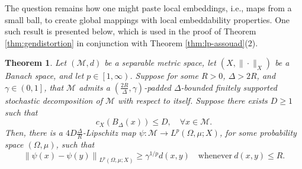 \documentclass[11pt,reqno]{amsart}
\newtheorem{theorem}{Theorem}
\newcommand{\1}{\mathbf 1}
\begin{document}
The question remains how one might paste local embeddings, i.e., maps from a small ball, to create global mappings with local embeddability properties. One such result is presented below, which is used in the proof of Theorem \ref{thm:gendistortion} in conjunction with Theorem \ref{thm:lp-assouad}(2).
\begin{theorem}
    Let $\left(\mathcal{M},d\right)$ be a separable metric space, let $\left(X,\|\cdot\|_X\right)$ be a Banach space, and let $p\in \left[1,\infty\right)$. Suppose for some $R>0$, $\Delta>2R$, and $\gamma\in \left(0,1\right]$, that $\mathcal{M}$ admits a $\left(\frac{2R}{\Delta},\gamma\right)$-padded $\Delta$-bounded finitely supported stochastic decomposition of $\mathcal{M}$ with respect to itself.
Suppose there exists $D\ge 1$ such that
    \[
    c_X\left(B_{\Delta}\left(x\right)\right)\le D,\quad \forall x\in \mathcal{M}.
    \]
    Then, there is a $4D \frac{\Delta}{R}$-Lipschitz map $\psi:\mathcal{M}\to L^p\left(\Omega,\mu;X\right)$, for some probability space $\left(\Omega,\mu\right)$, such that
    \[
\left\|\psi\left(x\right)-\psi\left(y\right)\right\|_{L^p\left(\Omega,\mu;X\right)}\ge \gamma^{1/p} d\left(x,y\right) \quad \mathrm{whenever}~d\left(x,y\right)\le R.
\]
\end{theorem}
\end{document}
